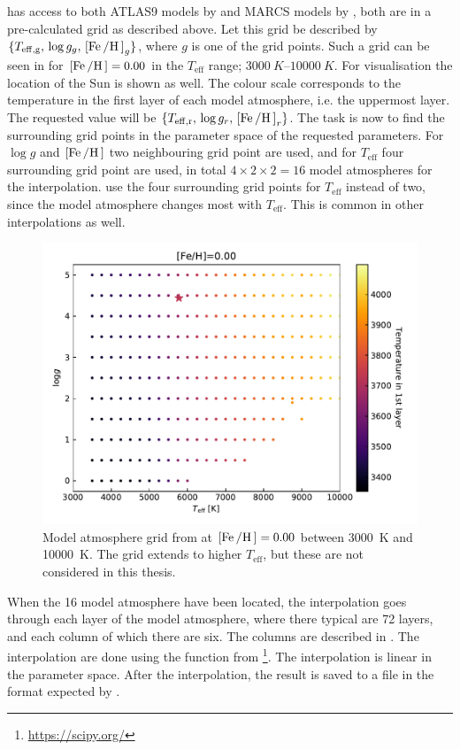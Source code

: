 \FASMA has access to both ATLAS9 models by \citet{Kurucz1993} and MARCS models
by \citet{Gustafson2008}, both are in a pre-calculated grid as described above.
Let this grid be described by $\{T_\mathrm{eff,g},\,\log
g_g,\,[\ion{Fe}/\ion{H}]_g\}$, where $g$ is one of the grid points. Such a grid
can be seen in  for $[\ion{Fe}/\ion{H}]=0.00$ in the
$T_\mathrm{eff}$ range; $\SIrange{3000}{10000}{K}$. For visualisation the
location of the Sun is shown as well. The colour scale corresponds to the
temperature in the first layer of each model atmosphere, i.e. the uppermost
layer. The requested value will be $\{T_\mathrm{eff,r},\,\log
g_r,\,[\ion{Fe}/\ion{H}]_r\}$. The task is now to find the surrounding grid
points in the parameter space of the requested parameters. For $\log g$ and
$[\ion{Fe}/\ion{H}]$ two neighbouring grid point are used, and for
$T_\mathrm{eff}$ four surrounding grid point are used, in total
$4\times2\times2=16$ model atmospheres for the interpolation. \FASMA use the
four surrounding grid points for $T_\mathrm{eff}$ instead of two, since the
model atmosphere changes most with $T_\mathrm{eff}$. This is common in other
interpolations as well.

\begin{figure}[htpb!]
    \centering
    \includegraphics[width=0.85\linewidth]{figures/model_atmosphere.pdf}
    \caption{Model atmosphere grid from \citet{Kurucz1993} at
             $[\ion{Fe}/\ion{H}]=0.00$ between \SI{3000}{K} and \SI{10000}{K}.
             The grid extends to higher $T_\mathrm{eff}$, but these are not
             considered in this thesis.}
    \label{fig:grid}
\end{figure}

When the 16 model atmosphere have been located, the interpolation goes through
each layer of the model atmosphere, where there typical are 72 layers, and each
column of which there are six. The columns are described in
. The interpolation are done using the
 function from \footnote{\url{https://scipy.org/}}.
The interpolation is linear in the parameter space. After the interpolation, the
result is saved to a file in the format expected by \MOOG.







